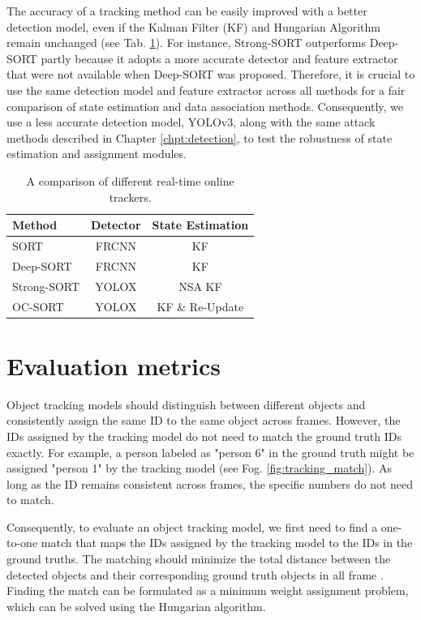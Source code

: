 The accuracy of a tracking method can be easily improved with a better detection model, even if the Kalman Filter (KF) and Hungarian Algorithm remain unchanged (see Tab. \ref{tab.mot_modules}). For instance, Strong-SORT outperforms Deep-SORT partly because it adopts a more accurate detector and feature extractor that were not available when Deep-SORT was proposed. Therefore, it is crucial to use the same detection model and feature extractor across all methods for a fair comparison of state estimation and data association methods. Consequently, we use a less accurate detection model, YOLOv3, along with the same attack methods described in Chapter \ref{chpt:detection}, to test the robustness of state estimation and assignment modules.

\begin{table}[H]
\centering
\begin{tabular}{ lcc } 
\hline
Method & Detector & State Estimation \\
\hline
SORT \citep{bewley2016simple} &    FRCNN   &   KF \\
Deep-SORT \citep{wojke2017simple}  &    FRCNN   &      KF  \\ 
Strong-SORT \citep{du2023strongsort}  &    YOLOX   &      NSA KF  \\ 
OC-SORT \citep{cao2023observation} &    YOLOX  & KF \& Re-Update \\ 
\hline
\end{tabular}
\caption{A comparison of different real-time online trackers.}
\label{tab.mot_modules}
\end{table}

\clearpage

\section{Evaluation metrics}
\label{sec:tracking_eval}

Object tracking models should distinguish between different objects and consistently assign the same ID to the same object across frames. However, the IDs assigned by the tracking model do not need to match the ground truth IDs exactly. For example, a person labeled as "person 6" in the ground truth might be assigned "person 1" by the tracking model (see Fog. \ref{fig:tracking_match}). As long as the ID remains consistent across frames, the specific numbers do not need to match.

Consequently, to evaluate an object tracking model, we first need to find a one-to-one match that maps the IDs assigned by the tracking model to the IDs in the ground truths. The matching should minimize the total distance between the detected objects and their corresponding ground truth objects in all frame \citep{ciaparrone2020deep}. Finding the match can be formulated as a minimum weight assignment problem, which can be solved using the Hungarian algorithm.

